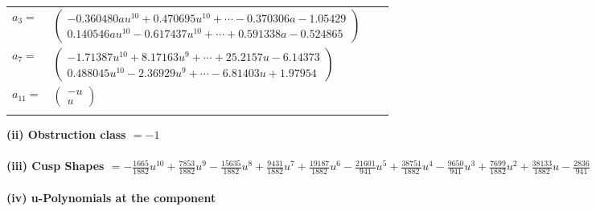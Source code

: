 \documentclass[1p]{elsarticle_modified}
\theoremstyle{definition}
\begin{document}
\begin{tabular}{m{7pt} m{180pt} m{7pt} m{180pt} }
\flushright $a_{3}=$&$\begin{pmatrix}-0.360480 a u^{10}+0.470695 u^{10}+\cdots-0.370306 a-1.05429\\0.140546 a u^{10}-0.617437 u^{10}+\cdots+0.591338 a-0.524865\end{pmatrix}$ \\
\flushright $a_{7}=$&$\begin{pmatrix}-1.71387 u^{10}+8.17163 u^{9}+\cdots+25.2157 u-6.14373\\0.488045 u^{10}-2.36929 u^{9}+\cdots-6.81403 u+1.97954\end{pmatrix}$ \\
\flushright $a_{11}=$&$\begin{pmatrix}- u\\u\end{pmatrix}$\\&\end{tabular}
\flushleft \textbf{(ii) Obstruction class $= -1$}\\~\\
\flushleft \textbf{(iii) Cusp Shapes $= -\frac{1665}{1882} u^{10}+\frac{7853}{1882} u^9-\frac{15635}{1882} u^8+\frac{9431}{1882} u^7+\frac{19187}{1882} u^6-\frac{21601}{941} u^5+\frac{38751}{1882} u^4-\frac{9650}{941} u^3+\frac{7699}{1882} u^2+\frac{38133}{1882} u-\frac{2836}{941}$}\\~\\
\newpage\renewcommand{\arraystretch}{1}
\flushleft \textbf{(iv) u-Polynomials at the component}\newline \\
\end{document}
